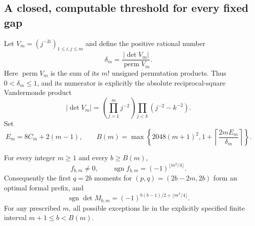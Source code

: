 \subsection{A closed, computable threshold for every fixed gap}

Let $V_m=(j^{-2i})_{1\le i,j\le m}$ and define the positive rational
number
\begin{equation}\label{eg:delta}
 \delta_m=\frac{|\det V_m|}{\operatorname{perm}V_m}.
\end{equation}
Here $\operatorname{perm}V_m$ is the sum of its $m!$ unsigned
permutation products.  Thus $0<\delta_m\le1$, and its numerator
is explicitly the absolute reciprocal-square Vandermonde product
\[
 |\det V_m|=
 \left(\prod_{j=1}^m j^{-2}\right)
             \prod_{j<k}(j^{-2}-k^{-2}).
\]
Set
\begin{equation}\label{eg:B}
 E_m=8C_m+2(m-1),\qquad
 \boxed{\displaystyle
 B(m)=\max\left\{2048(m+1)^2,
       1+\left\lceil\frac{2mE_m}{\delta_m}\right\rceil\right\}.}
\end{equation}

\begin{theorem}
\label{eg:effective}
For every integer $m\ge1$ and every $b\ge B(m)$,
\begin{equation}\label{eg:general-sign}
 f_{b,m}\ne0,\qquad
 \operatorname{sgn}f_{b,m}=(-1)^{\lfloor m^2/4\rfloor}.
\end{equation}
Consequently the first $q=2b$ moments for
$(p,q)=(2b-2m,2b)$ form an optimal formal prefix, and
\[
 \operatorname{sgn}\det M_{b,m}
       =(-1)^{b(b-1)/2+\lfloor m^2/4\rfloor}.
\]
For any prescribed $m$, all possible exceptions lie in the explicitly
specified finite interval $m+1\le b<B(m)$.
\end{theorem}

